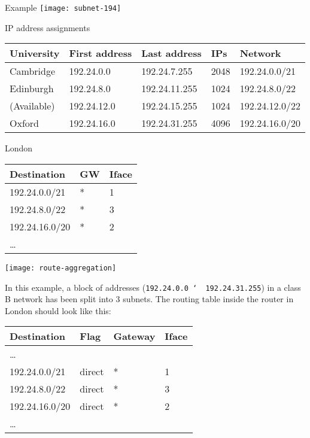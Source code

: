 \begin{frame}{Example}
  \vspace*{-1.5em}
  \texttt{[image: subnet-194]}

  \begin{iblock}{IP address assignments}
    {\scriptsize\ttfamily
      \begin{tabular}{lllll}\hline
        University&First address&Last address&IPs&Network\\\hline
        Cambridge&192.24.0.0&192.24.7.255&2048&192.24.0.0/21\\
        Edinburgh&192.24.8.0&192.24.11.255&1024&192.24.8.0/22\\
        (Available)&192.24.12.0&192.24.15.255&1024&192.24.12.0/22\\
        Oxford&192.24.16.0&192.24.31.255&4096&192.24.16.0/20\\\hline
      \end{tabular}}
  \end{iblock}  
  \begin{minipage}{.4\linewidth}
    \begin{iblock}{London}
      {\ttfamily\scriptsize
      \begin{tabular}{lll}\hline
        Destination&GW&Iface\\\hline
        192.24.0.0/21&*&1\\
        192.24.8.0/22&*&3\\
        192.24.16.0/20&*&2\\
        \ldots&&\\\hline
      \end{tabular}}
    \end{iblock}    
  \end{minipage}\hfill
  \begin{minipage}{.55\linewidth}
    \texttt{[image: route-aggregation]}
  \end{minipage}
\end{frame}

In this example, a block of addresses (\texttt{192.24.0.0 \char`~ 192.24.31.255}) in a class B
network has been split into 3 subnets. The routing table inside the router in London
should look like this:
\begin{center}
  \begin{tabular}{llll}\toprule
    Destination&Flag&Gateway&Iface\\\midrule
    \ldots&&&\\
    192.24.0.0/21&direct&*&1\\
    192.24.8.0/22&direct&*&3\\
    192.24.16.0/20&direct&*&2\\
    \ldots&&&\\\hline
  \end{tabular}
\end{center}

